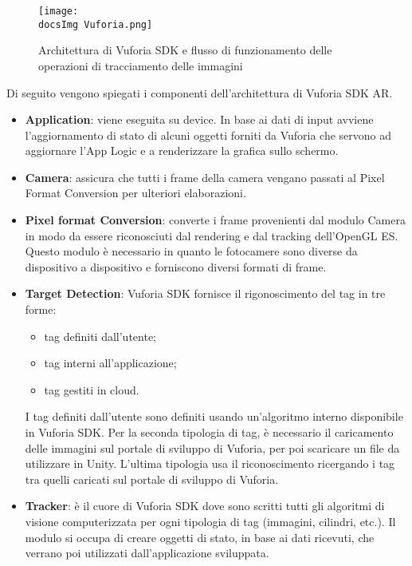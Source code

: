 \begin{figure}[H]
	\centering
	\texttt{[image: \\docsImg Vuforia.png]}
	\caption{Architettura di Vuforia SDK e flusso di funzionamento delle operazioni di tracciamento delle immagini}
	\label{fig:Architettura di Vuforia SDK e flusso di funzionamento delle operazioni di tracciamento delle immagini
	}
\end{figure}

Di seguito vengono spiegati i componenti dell'architettura di Vuforia SDK AR.

\begin{itemize}
	\item \textbf{Application}: viene eseguita su device. In base ai dati di input avviene l'aggiornamento di stato di alcuni oggetti forniti da Vuforia che servono ad aggiornare l'App Logic e a renderizzare la grafica sullo schermo.
	\item  \textbf{Camera}: assicura che tutti i frame della camera vengano passati al Pixel Format Conversion per ulteriori elaborazioni.
	\item \textbf{Pixel format Conversion}: converte i frame provenienti dal modulo Camera in modo da essere riconosciuti dal rendering e dal tracking dell'OpenGL ES. Questo modulo \`e necessario in quanto le fotocamere sono diverse da dispositivo a dispositivo e forniscono diversi formati di frame.
	\item \textbf{Target Detection}: Vuforia SDK fornisce il rigonoscimento del tag in tre forme:
	\begin{itemize}
		\item tag definiti dall'utente;
		\item tag interni all'applicazione;
		\item tag gestiti in cloud.
	\end{itemize} 
	I tag definiti dall'utente sono definiti usando un'algoritmo interno disponibile in Vuforia SDK. Per la seconda tipologia di tag, \`e necessario il caricamento delle immagini sul portale di sviluppo di Vuforia, per poi scaricare un file da utilizzare in Unity. L'ultima tipologia usa il riconoscimento ricergando i tag tra quelli caricati sul portale di sviluppo di Vuforia.
	\item \textbf{Tracker}: \`e il cuore di Vuforia SDK dove sono scritti tutti gli algoritmi di visione computerizzata per ogni tipologia di tag (immagini, cilindri, etc.). Il modulo si occupa di creare oggetti di stato, in base ai dati ricevuti, che verrano poi utilizzati dall'applicazione sviluppata.
\end{itemize}



